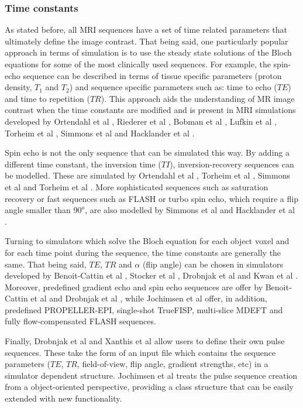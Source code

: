 \subsubsection{Time constants}
As stated before, all MRI sequences have a set of time related parameters that ultimately define the image contrast. That being said, one particularly popular approach in terms of simulation is to use the steady state solutions of the Bloch equations for some of the most clinically used sequences. For example, the spin-echo sequence can be described in terms of tissue specific parameters (proton density, $T_1$ and $T_2$) and sequence specific parameters such as: time to echo ($TE$) and time to repetition ($TR$). This approach aids the understanding of MR image contrast when the time constants are modified and is present in MRI simulations developed by Ortendahl et al \cite{Ortendahl1984}, Riederer et al \cite{Riederer1984}, Bobman et al \cite{Bobman1985}, Lufkin et al \cite{Lufkin1986}, Torheim et al \cite{Torheim1994}, Simmons et al \cite{Simmons1996} and Hacklander et al \cite{Hacklander2005}. 

Spin echo is not the only sequence that can be simulated this way. By adding a different time constant, the inversion time ($TI$), inversion-recovery sequences can be modelled. These are simulated by Ortendahl et al \cite{Ortendahl1984}, Torheim et al \cite{Torheim1994}, Simmons et al \cite{Simmons1996} and Torheim et al \cite{Torheim1994}. More sophisticated sequences such as saturation recovery or fast sequences such as FLASH or turbo spin echo, which require a flip angle smaller than $90^o$, are also modelled by Simmons et al \cite{Simmons1996} and Hacklander et al \cite{Hacklander2005}.

Turning to simulators which solve the Bloch equation for each object voxel and for each time point during the sequence, the time constants are generally the same. That being said, $TE$, $TR$ and $\alpha$ (flip angle) can be chosen in simulators developed by Benoit-Cattin et al \cite{Benoit-Cattin2005}, Stocker et al \cite{Stocker2010}, Drobnjak et al \cite{Drobnjak2006} and Kwan et al \cite{Kwan1999}. Moreover, predefined gradient echo and spin echo sequences are offer by Benoit-Cattin et al \cite{Benoit-Cattin2005} and Drobnjak et al \cite{Drobnjak2006}, while Jochimsen et al \cite{Jochimsen2004} offer, in addition, predefined PROPELLER-EPI, single-shot TrueFISP, multi-slice MDEFT and fully flow-compensated FLASH sequences.

Finally, Drobnjak et al \cite{Drobnjak2006} and Xanthis et al \cite{Xanthis2014} allow users to define their own pulse sequences. These take the form of an input file which contains the sequence parameters ($TE$, $TR$, field-of-view, flip angle, gradient strengths, etc) in a simulator dependent structure. Jochimsen et al \cite{Jochimsen2004} treats the pulse sequence creation from a object-oriented perspective, providing a class structure that can be easily extended with new functionality.

